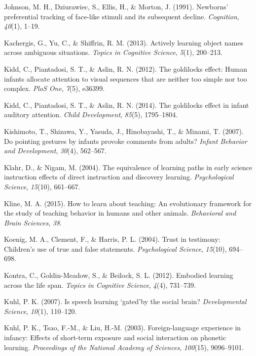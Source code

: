 \documentclass[english,floatsintext,man]{apa6}
\theoremstyle{definition}
\theoremstyle{definition}
\theoremstyle{definition}
\theoremstyle{remark}
\begin{document}
\hypertarget{ref-johnson1991newborns}{}
Johnson, M. H., Dziurawiec, S., Ellis, H., \& Morton, J. (1991).
Newborns' preferential tracking of face-like stimuli and its subsequent
decline. \emph{Cognition}, \emph{40}(1), 1--19.

\hypertarget{ref-kachergis2013actively}{}
Kachergis, G., Yu, C., \& Shiffrin, R. M. (2013). Actively learning
object names across ambiguous situations. \emph{Topics in Cognitive
Science}, \emph{5}(1), 200--213.

\hypertarget{ref-kidd2012goldilocks}{}
Kidd, C., Piantadosi, S. T., \& Aslin, R. N. (2012). The goldilocks
effect: Human infants allocate attention to visual sequences that are
neither too simple nor too complex. \emph{PloS One}, \emph{7}(5),
e36399.

\hypertarget{ref-kidd2014goldilocks}{}
Kidd, C., Piantadosi, S. T., \& Aslin, R. N. (2014). The goldilocks
effect in infant auditory attention. \emph{Child Development},
\emph{85}(5), 1795--1804.

\hypertarget{ref-kishimoto2007pointing}{}
Kishimoto, T., Shizawa, Y., Yasuda, J., Hinobayashi, T., \& Minami, T.
(2007). Do pointing gestures by infants provoke comments from adults?
\emph{Infant Behavior and Development}, \emph{30}(4), 562--567.

\hypertarget{ref-klahr2004equivalence}{}
Klahr, D., \& Nigam, M. (2004). The equivalence of learning paths in
early science instruction effects of direct instruction and discovery
learning. \emph{Psychological Science}, \emph{15}(10), 661--667.

\hypertarget{ref-kline2015learn}{}
Kline, M. A. (2015). How to learn about teaching: An evolutionary
framework for the study of teaching behavior in humans and other
animals. \emph{Behavioral and Brain Sciences}, \emph{38}.

\hypertarget{ref-koenig2004trust}{}
Koenig, M. A., Clement, F., \& Harris, P. L. (2004). Trust in testimony:
Children's use of true and false statements. \emph{Psychological
Science}, \emph{15}(10), 694--698.

\hypertarget{ref-kontra2012embodied}{}
Kontra, C., Goldin-Meadow, S., \& Beilock, S. L. (2012). Embodied
learning across the life span. \emph{Topics in Cognitive Science},
\emph{4}(4), 731--739.

\hypertarget{ref-kuhl2007speech}{}
Kuhl, P. K. (2007). Is speech learning `gated'by the social brain?
\emph{Developmental Science}, \emph{10}(1), 110--120.

\hypertarget{ref-kuhl2003foreign}{}
Kuhl, P. K., Tsao, F.-M., \& Liu, H.-M. (2003). Foreign-language
experience in infancy: Effects of short-term exposure and social
interaction on phonetic learning. \emph{Proceedings of the National
Academy of Sciences}, \emph{100}(15), 9096--9101.
\end{document}
